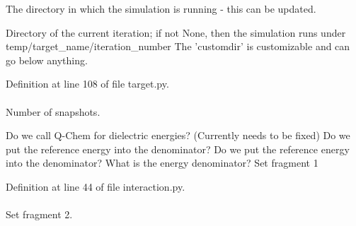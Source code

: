 \-The directory in which the simulation is running -\/ this can be updated. 

\-Directory of the current iteration; if not \-None, then the simulation runs under temp/target\-\_\-name/iteration\-\_\-number \-The 'customdir' is customizable and can go below anything.

\-Definition at line 108 of file target.\-py.

\hypertarget{classforcebalance_1_1interaction_1_1Interaction_ab39f595a8116711d03992a37776ec7e7}{
\paragraph[{select1}]{}}\label{classforcebalance_1_1interaction_1_1Interaction_ab39f595a8116711d03992a37776ec7e7}


\-Number of snapshots. 

\-Do we call \-Q-\/\-Chem for dielectric energies? (\-Currently needs to be fixed) \-Do we put the reference energy into the denominator? \-Do we put the reference energy into the denominator? \-What is the energy denominator? \-Set fragment 1 

\-Definition at line 44 of file interaction.\-py.

\hypertarget{classforcebalance_1_1interaction_1_1Interaction_a98d153938051d0290f3164f28305f160}{
\paragraph[{select2}]{}}\label{classforcebalance_1_1interaction_1_1Interaction_a98d153938051d0290f3164f28305f160}


\-Set fragment 2. 



